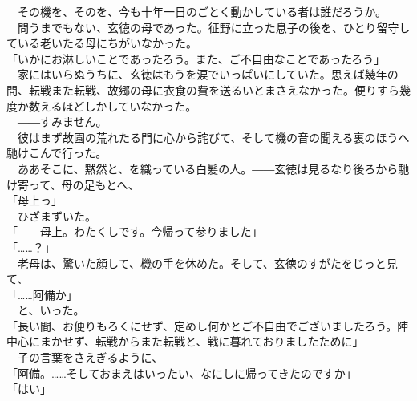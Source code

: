 \documentclass[
  paper=a5,
  fontsize=10pt,
  jafontsize=9.5pt,
  tate,                  %
  open_bracket_pos=nibu, %
]{jlreq}
\begin{document}
　その機を、そのを、今も十年一日のごとく動かしている者は誰だろうか。\\


　問うまでもない、玄徳の母であった。征野に立った息子の後を、ひとり留守している老いたる母にちがいなかった。\\


「いかにお淋しいことであったろう。また、ご不自由なことであったろう」\\


　家にはいらぬうちに、玄徳はもうを涙でいっぱいにしていた。思えば幾年の間、転戦また転戦、故郷の母に衣食の費を送るいとまさえなかった。便りすら幾度か数えるほどしかしていなかった。\\


　――すみません。\\


　彼はまず故園の荒れたる門に心から詫びて、そして機の音の聞える裏のほうへ馳けこんで行った。\\


　ああそこに、黙然と、を織っている白髪の人。――玄徳は見るなり後ろから馳け寄って、母の足もとへ、\\


「母上っ」\\


　ひざまずいた。\\


「――母上。わたくしです。今帰って参りました」\\


「……？」\\


　老母は、驚いた顔して、機の手を休めた。そして、玄徳のすがたをじっと見て、\\


「……阿備か」\\


　と、いった。\\


「長い間、お便りもろくにせず、定めし何かとご不自由でございましたろう。陣中心にまかせず、転戦からまた転戦と、戦に暮れておりましたために」\\


　子の言葉をさえぎるように、\\


「阿備。……そしておまえはいったい、なにしに帰ってきたのですか」\\


「はい」\\
\end{document}
